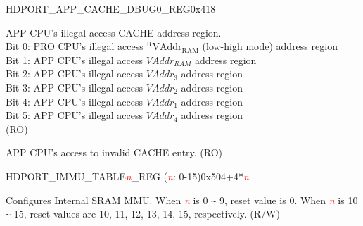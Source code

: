 \begin{register}{H}{DPORT\_APP\_CACHE\_DBUG0\_REG}{0x418}\label{regdesc:DPORTAPPCACHEDBUG1REG}
%
%
%
\regnewline%
\begin{regdesc}\begin{reglist}
\item [DPORT\_APP\_CACHE\_ACCESS\_ILLEGAL] APP CPU's illegal access CACHE address region.\\
Bit 0: PRO CPU's illegal access $^{\mathrm{R}}\mathrm{VAddr}_{\mathrm{RAM}}$ (low-high mode) address region\\
Bit 1: APP CPU's illegal access ${VAddr}_{RAM}$ address region\\
Bit 2: APP CPU's illegal access $VAddr_3$ address region\\
Bit 3: APP CPU's illegal access $VAddr_2$ address region\\
Bit 4: APP CPU's illegal access $VAddr_1$ address region\\
Bit 5: APP CPU's illegal access $VAddr_4$ address region\\
(RO)
\item [DPORT\_APP\_CACHE\_MMU\_ILLEGAL] APP CPU's access to invalid CACHE entry. (RO)
\end{reglist}\end{regdesc}
\end{register}

\begin{register}{H}{DPORT\_IMMU\_TABLE\textcolor{red}{\it{n}}\_REG ({\textcolor{red}{\it{n}}}: 0-15)}{0x504+4*\textcolor{red}{\textcolor{red}{\it{n}}}}\label{regdesc:IMMUTABLEnREG}
%
%
\regnewline%
\begin{regdesc}\begin{reglist}
\item [DPORT\_IMMU\_TABLE\textcolor{red}{\textcolor{red}{\it{n}}}] Configures Internal SRAM MMU. When \textcolor{red}{\it{n}} is 0 \verb+~+ 9, reset value is 0. When \textcolor{red}{\it{n}} is 10 \verb+~+ 15, reset values are 10, 11, 12, 13, 14, 15, respectively. (R/W)
\end{reglist}\end{regdesc}
\end{register}


